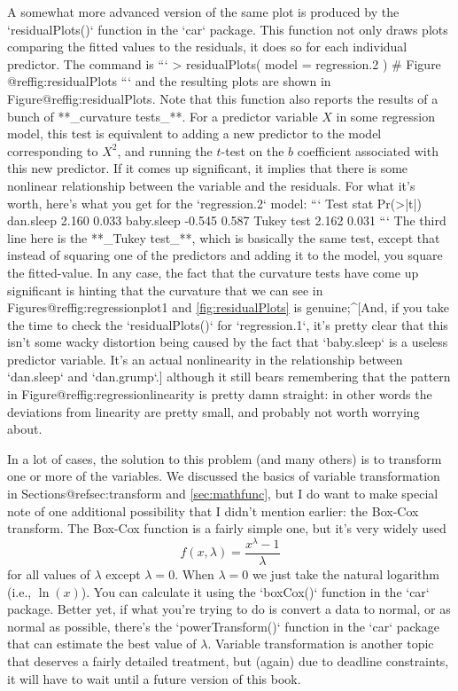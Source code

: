 A somewhat more advanced version of the same plot is produced by the `residualPlots()` function in the `car` package. This function not only draws plots comparing the fitted values to the residuals, it does so for each individual predictor. The command is
```
> residualPlots( model = regression.2 )   # Figure @ref{fig:residualPlots}
```	
and the resulting plots are shown in Figure@reffig:residualPlots. Note that this function also reports the results of a bunch of **_curvature tests_**. For a predictor variable $X$ in some regression model, this test is equivalent to adding a new predictor to the model corresponding to $X^2$, and running the $t$-test on the $b$ coefficient associated with this new predictor. If it comes up significant, it implies that there is some nonlinear relationship between the variable and the residuals. For what it's worth, here's what you get for the `regression.2` model:
```
           Test stat Pr(>|t|)
dan.sleep      2.160    0.033
baby.sleep    -0.545    0.587
Tukey test     2.162    0.031
```
The third line here is the **_Tukey test_**, which is basically the same test, except that instead of squaring one of the predictors and adding it to the model, you square the fitted-value. In any case, the fact that the curvature tests have come up significant is hinting that the curvature that we can see in Figures@reffig:regressionplot1 and \ref{fig:residualPlots} is genuine;^[And, if you take the time to check the `residualPlots()` for `regression.1`, it's pretty clear that this isn't some wacky distortion being caused by the fact that `baby.sleep` is a useless predictor variable. It's an actual nonlinearity in the relationship between `dan.sleep` and `dan.grump`.] although it still bears remembering that the pattern in Figure@reffig:regressionlinearity is pretty damn straight: in other words the deviations from linearity are pretty small, and probably not worth worrying about.

In a lot of cases, the solution to this problem (and many others) is to transform one or more of the variables. We discussed the basics of variable transformation in Sections@refsec:transform and \ref{sec:mathfunc}, but I do want to make special note of one additional possibility that I didn't mention earlier: the Box-Cox transform. The Box-Cox function is a fairly simple one, but it's very widely used 
$$
f(x,\lambda) = \frac{x^\lambda - 1}{\lambda}
$$
for all values of $\lambda$ except $\lambda = 0$. When $\lambda = 0$ we just take the natural logarithm (i.e., $\ln(x)$). You can calculate it using the `boxCox()` function in the `car` package. Better yet, if what you're trying to do is convert a data to normal, or as normal as possible, there's the `powerTransform()` function in the `car` package that can estimate the best value of $\lambda$. Variable transformation is another topic that deserves a fairly detailed treatment, but (again) due to deadline constraints, it will have to wait until a future version of this book. 




